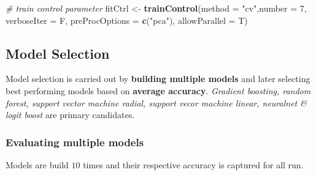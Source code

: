 \documentclass[]{article}
\newenvironment{Shaded}{\begin{snugshade}}{\end{snugshade}}
\newcommand{\KeywordTok}[1]{\textcolor[rgb]{0.13,0.29,0.53}{\textbf{{#1}}}}
\newcommand{\DataTypeTok}[1]{\textcolor[rgb]{0.13,0.29,0.53}{{#1}}}
\newcommand{\DecValTok}[1]{\textcolor[rgb]{0.00,0.00,0.81}{{#1}}}
\newcommand{\StringTok}[1]{\textcolor[rgb]{0.31,0.60,0.02}{{#1}}}
\newcommand{\CommentTok}[1]{\textcolor[rgb]{0.56,0.35,0.01}{\textit{{#1}}}}
\newcommand{\NormalTok}[1]{{#1}}
\begin{document}
\begin{Shaded}
\begin{Highlighting}[]
\CommentTok{# train control parameter}
\NormalTok{fitCtrl <-}\StringTok{ }\KeywordTok{trainControl}\NormalTok{(}\DataTypeTok{method =} \StringTok{"cv"}\NormalTok{,}\DataTypeTok{number =} \DecValTok{7}\NormalTok{, }\DataTypeTok{verboseIter =} \NormalTok{F, }
                        \DataTypeTok{preProcOptions =} \KeywordTok{c}\NormalTok{(}\StringTok{"pca"}\NormalTok{),}
                        \DataTypeTok{allowParallel =} \NormalTok{T)}
\end{Highlighting}
\end{Shaded}

\subsection{Model Selection}\label{model-selection}

Model selection is carried out by \textbf{building multiple models} and
later selecting best performing models based on \textbf{average
accuracy}. \emph{Gradient boosting, random forest, support vector
machine radial, support vecor machine linear, neuralnet \& logit boost}
are primary candidates.

\subsubsection{Evaluating multiple
models}\label{evaluating-multiple-models}

Models are build \(10\) times and their respective accuracy is captured
for all run.
\end{document}
